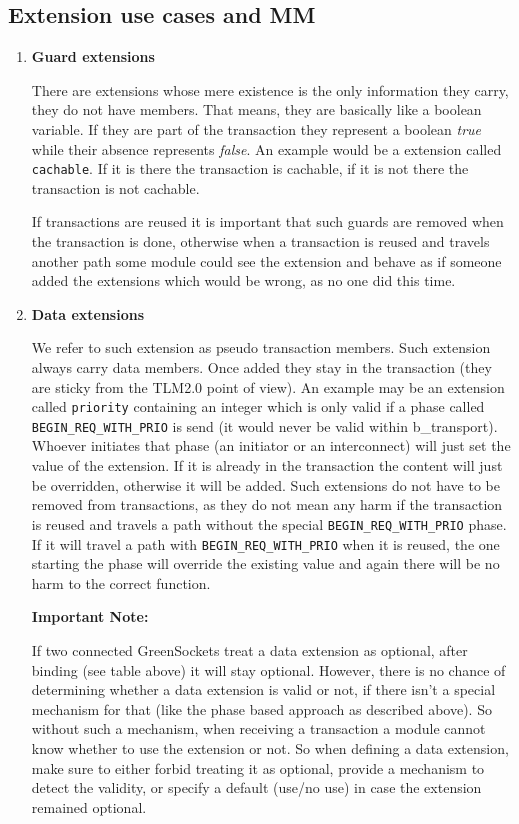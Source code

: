 \documentclass[a4paper,10pt]{article}          %
\begin{document}
\vspace{4mm}
\subsection{Extension use cases and MM}
\vspace{4mm}

\begin{enumerate}
\item \textbf{Guard extensions}

There are extensions whose mere existence is the only information they carry, they do not have members. That means, they are basically like a boolean variable. If they are part of the transaction they represent a boolean \emph{true} while their absence represents \emph{false}. An example would be a extension called \verb|cachable|.
If it is there the transaction is cachable, if it is not there the transaction is not cachable. 

If transactions are reused it is important that such guards are removed when the transaction is done, otherwise when a transaction is reused and travels another path some module could see the extension and behave as if someone added the extensions which would be wrong, as no one did this time.

\item \textbf{Data extensions}

We refer to such extension as pseudo transaction members. Such extension always carry data members. Once added they stay in the transaction (they are sticky from the TLM2.0 point of view). An example may be an extension called \verb|priority| containing an integer which is only valid if a phase called \verb|BEGIN_REQ_WITH_PRIO| is send (it would never be valid within b\_transport). Whoever initiates that phase (an initiator or an interconnect) will just set the value of the extension. If it is already in the transaction the content will just be overridden, otherwise it will be added. Such extensions do not have to be removed from transactions, as they do not mean any harm if the transaction is reused and travels a path without the special \verb|BEGIN_REQ_WITH_PRIO| phase. If it will travel a path with \verb|BEGIN_REQ_WITH_PRIO| when it is reused, the one starting the phase will override the existing value and again there will be no harm to the correct function.

\textbf{Important Note:}

If two connected GreenSockets treat a data extension as optional, after binding (see table above) it will stay optional. However, there is no chance of determining whether a data extension is valid or not, if there isn't a special mechanism for that (like the phase based approach as described above). So without such a mechanism, when receiving a transaction a module cannot know whether to use the extension or not. So when defining a data extension, make sure to either forbid treating it as optional, provide a mechanism to detect the validity, or specify a default (use/no use) in case the extension remained optional.


\end{enumerate}
\end{document}
